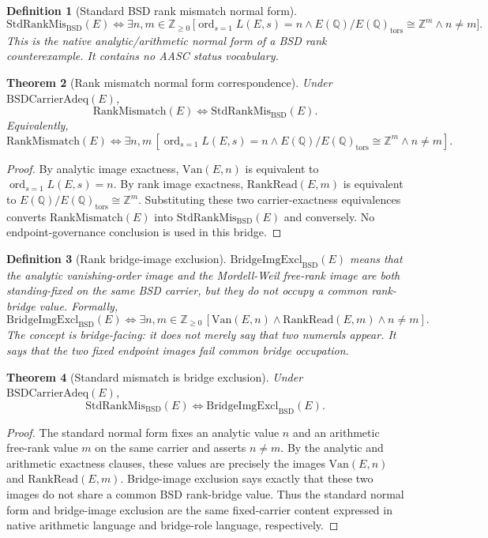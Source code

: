 \documentclass[11pt]{article}
\newtheorem{theorem}{Theorem}[section]
\newtheorem{definition}[theorem]{Definition}
\newcommand{\Q}{\mathbb{Q}}
\newcommand{\Z}{\mathbb{Z}}
\newcommand{\ord}{\operatorname{ord}}
\newcommand{\tors}{\operatorname{tors}}
\newcommand{\BSD}{\mathrm{BSD}}
\newcommand{\Van}{\mathrm{Van}}
\newcommand{\RankRead}{\mathrm{RankRead}}
\newcommand{\RankMismatch}{\mathrm{RankMismatch}}
\newcommand{\StdRankMis}{\mathrm{StdRankMis}_{\BSD}}
\newcommand{\BridgeImgExcl}{\mathrm{BridgeImgExcl}_{\BSD}}
\begin{document}
\begin{definition}[Standard BSD rank mismatch normal form]
\[
\StdRankMis(E)
\Longleftrightarrow
\exists n,m\in\Z_{\ge0}\,
\bigl[\ord_{s=1}L(E,s)=n
\wedge E(\Q)/E(\Q)_{\tors}\cong \Z^m
\wedge n\neq m\bigr].
\]
This is the native analytic/arithmetic normal form of a BSD rank counterexample. It contains no AASC status vocabulary.
\end{definition}

\begin{theorem}[Rank mismatch normal form correspondence]\label{thm:mismatch-normal}
Under $\mathrm{BSDCarrierAdeq}(E)$,
\[
\RankMismatch(E)\Longleftrightarrow \StdRankMis(E).
\]
Equivalently,
\[
\RankMismatch(E)
\Longleftrightarrow
\exists n,m\,[\ord_{s=1}L(E,s)=n\wedge E(\Q)/E(\Q)_{\tors}\cong\Z^m\wedge n\neq m].
\]
\end{theorem}

\begin{proof}
By analytic image exactness, $\Van(E,n)$ is equivalent to $\ord_{s=1}L(E,s)=n$. By rank image exactness, $\RankRead(E,m)$ is equivalent to $E(\Q)/E(\Q)_{\tors}\cong\Z^m$. Substituting these two carrier-exactness equivalences converts $\RankMismatch(E)$ into $\StdRankMis(E)$ and conversely. No endpoint-governance conclusion is used in this bridge.
\end{proof}

\begin{definition}[Rank bridge-image exclusion]
$\BridgeImgExcl(E)$ means that the analytic vanishing-order image and the Mordell-Weil free-rank image are both standing-fixed on the same BSD carrier, but they do not occupy a common rank-bridge value. Formally,
\[
\BridgeImgExcl(E)
\Longleftrightarrow
\exists n,m\in\Z_{\ge0}\,[\Van(E,n)\wedge \RankRead(E,m)\wedge n\neq m].
\]
The concept is bridge-facing: it does not merely say that two numerals appear. It says that the two fixed endpoint images fail common bridge occupation.
\end{definition}

\begin{theorem}[Standard mismatch is bridge exclusion]\label{thm:normal-bridge-equivalence}
Under $\mathrm{BSDCarrierAdeq}(E)$,
\[
\StdRankMis(E)\Longleftrightarrow \BridgeImgExcl(E).
\]
\end{theorem}

\begin{proof}
The standard normal form fixes an analytic value $n$ and an arithmetic free-rank value $m$ on the same carrier and asserts $n\neq m$. By the analytic and arithmetic exactness clauses, these values are precisely the images $\Van(E,n)$ and $\RankRead(E,m)$. Bridge-image exclusion says exactly that these two images do not share a common BSD rank-bridge value. Thus the standard normal form and bridge-image exclusion are the same fixed-carrier content expressed in native arithmetic language and bridge-role language, respectively.
\end{proof}
\end{document}
